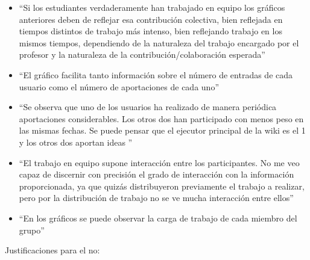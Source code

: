 \begin{itemize}
\item ``Si los estudiantes verdaderamente han trabajado en equipo los gráficos anteriores deben de reflejar esa contribución colectiva, bien reflejada en tiempos distintos de trabajo más intenso, bien reflejando trabajo en los mismos tiempos, dependiendo de la naturaleza del trabajo encargado por el profesor y la naturaleza de la contribución/colaboración esperada''
\item ``El gráfico facilita tanto información sobre el número de entradas de cada usuario como el número de aportaciones de cada uno''
\item ``Se observa que uno de los usuarios ha realizado de manera periódica aportaciones considerables. Los otros dos han participado con menos peso  en las mismas fechas. Se puede pensar que el ejecutor principal de la wiki es el 1 y los otros dos aportan ideas ''
\item ``El trabajo en equipo supone interacción entre los participantes. No me veo capaz de discernir con precisión el grado de interacción con la información proporcionada, ya que quizás distribuyeron previamente el trabajo a realizar, pero por la distribución de trabajo no se ve mucha interacción entre ellos''
\item ``En los gráficos se puede observar la carga de trabajo de cada miembro del grupo''
\end{itemize}

Justificaciones para el no:

